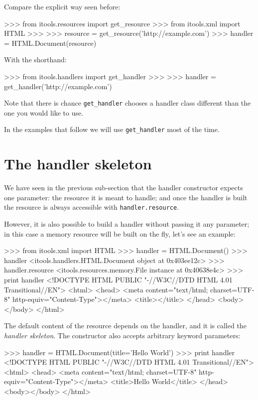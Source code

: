Compare the explicit way seen before:

\begin{code}
    >>> from itools.resources import get_resource
    >>> from itools.xml import HTML
    >>>
    >>> resource = get_resource('http://example.com')
    >>> handler = HTML.Document(resource)
\end{code}

With the shorthand:

\begin{code}
    >>> from itools.handlers import get_handler
    >>>
    >>> handler = get_handler('http://example.com')
\end{code}

Note that there is chance {\tt get\_handler} chooses a handler class
different than the one you would like to use.

In the examples that follow we will use {\tt get\_handler} most of the
time.


\section{The handler skeleton}

We have seen in the previous sub-section that the handler constructor expects
one parameter: the resource it is meant to handle; and once the handler is
built the resource is always accessible with {\tt handler.resource}.

However, it is also possible to build a handler without passing it any
parameter; in this case a memory resource will be built on the fly, let's
see an example:

\begin{code}
    >>> from itools.xml import HTML
    >>> handler = HTML.Document()
    >>> handler
    <itools.handlers.HTML.Document object at 0x403ee12c>
    >>> handler.resource
    <itools.resources.memory.File instance at 0x40638e4c>
    >>> print handler
    <!DOCTYPE HTML PUBLIC "-//W3C//DTD HTML 4.01 Transitional//EN">
    <html>
      <head>
        <meta content="text/html; charset=UTF-8" http-equiv="Content-Type"></meta>
        <title></title>
      </head>
      <body></body>
    </html>
\end{code}

The default content of the resource depends on the handler, and it is called
the {\em handler skeleton}. The constructor also accepts arbitrary keyword
parameters:

\begin{code}
    >>> handler = HTML.Document(title='Hello World')
    >>> print handler
    <!DOCTYPE HTML PUBLIC "-//W3C//DTD HTML 4.01 Transitional//EN">
    <html>
      <head>
        <meta content="text/html; charset=UTF-8" http-equiv="Content-Type"></meta>
        <title>Hello World</title>
      </head>
      <body></body>
    </html>
\end{code}

